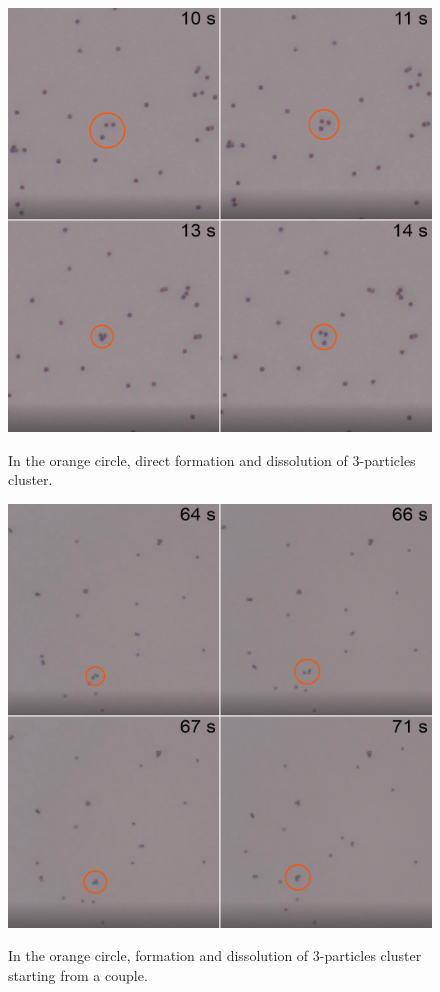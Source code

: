 \documentclass[../../master_thesis_np.tex]{subfiles}
\begin{document}
	\begin{figure}[hbtp]
		\centering
		\includegraphics[width = \textwidth]{qual/trip17.png}
		\label{fig:trip17}
		\caption{In the orange circle, direct formation and dissolution of 3-particles cluster.}
	\end{figure}
	
	\begin{figure}[hbtp]
		\centering
		\includegraphics[width = \textwidth]{qual/trip9.png}
		\label{fig:trip9}
		\caption{In the orange circle, formation and dissolution of 3-particles cluster starting from a couple.}
	\end{figure}
	
\end{document}
